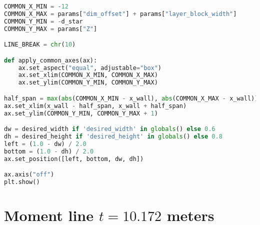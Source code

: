 \begin{lstlisting}[language=Python]
COMMON_X_MIN = -12
COMMON_X_MAX = params["dim_offset"] + params["layer_block_width"]
COMMON_Y_MIN = -d_star
COMMON_Y_MAX = params["Z"]

LINE_BREAK = chr(10)

def apply_common_axes(ax):
    ax.set_aspect("equal", adjustable="box")
    ax.set_xlim(COMMON_X_MIN, COMMON_X_MAX)
    ax.set_ylim(COMMON_Y_MIN, COMMON_Y_MAX)

half_span = max(abs(COMMON_X_MIN - x_wall), abs(COMMON_X_MAX - x_wall))
ax.set_xlim(x_wall - half_span, x_wall + half_span)
ax.set_ylim(COMMON_Y_MIN, COMMON_Y_MAX + 1)

dw = desired_width if 'desired_width' in globals() else 0.6
dh = desired_height if 'desired_height' in globals() else 0.8
left = (1.0 - dw) / 2.0
bottom = (1.0 - dh) / 2.0
ax.set_position([left, bottom, dw, dh])

ax.axis("off")
plt.show()
\end{lstlisting}


\section{Moment line $t = 10.172$ meters}

